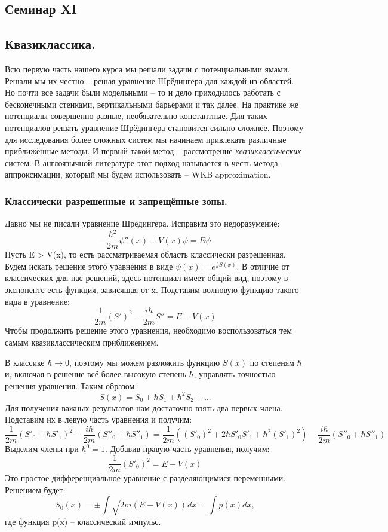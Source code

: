 \begin{center}
    \section{Семинар XI}
\end{center}
\subsection{Квазиклассика.}
\hspace{1em} Всю первую часть нашего курса мы решали задачи с потенциальными ямами. Решали мы их честно -- решая уравнение Шрёдингера для каждой из областей. Но почти все задачи были модельными -- то и дело приходилось работать с бесконечными стенками, вертикальными барьерами и так далее. На практике же потенциалы совершенно разные, необязательно константные. Для таких потенциалов решать уравнение Шрёдингера становится сильно сложнее. Поэтому для исследования более сложных систем мы начинаем привлекать различные приближённые методы. И первый такой метод -- рассмотрение \textit{квазиклассических} систем. В англоязычной литературе этот подход называется в честь метода аппроксимации, который мы будем использовать -- WKB approximation.

\subsubsection{Классически разрешенные и запрещённые зоны.}
\hspace{1em} Давно мы не писали уравнение Шрёдингера. Исправим это недоразумение:
\[
-\frac{\hbar^2}{2m}\psi''(x) + V(x)\psi = E\psi
\]
Пусть E > V(x), то есть рассматриваемая область классически разрешенная. Будем искать решение этого уравнения в виде $\psi(x) = e^{\frac{i}{\hbar}S(x)}$. В отличие от классических для нас решений, здесь потенциал имеет общий вид, поэтому в экспоненте есть функция, зависящая от x. Подставим волновую функцию такого вида в уравнение:
\[
\frac{1}{2m}(S')^2 - \frac{i\hbar}{2m}S'' = E - V(x)
\]
Чтобы продолжить решение этого уравнения, необходимо воспользоваться тем самым квазиклассическим приближением. 

В классике $\hbar \rightarrow 0$, поэтому мы можем разложить функцию $S(x)$ по степеням $\hbar$ и, включая в решение всё более высокую степень $\hbar$, управлять точностью решения уравнения. Таким образом:
\[
S(x) = S_0 + \hbar S_1 + \hbar^2 S_2 + ...
\]
Для получения важных результатов нам достаточно взять два первых члена. Подставим их в левую часть уравнения и получим:
\[
\frac{1}{2m}\left( S'_0 + \hbar S'_1 \right)^2 - \frac{i\hbar}{2m}(S''_0 + \hbar S''_1) = \frac{1}{2m}\left( (S'_0)^2 + 2\hbar S'_0 S'_1 + \hbar^2 (S'_1)^2 \right) - \frac{i\hbar}{2m}(S''_0 + \hbar S''_1)
\]
Выделим члены при $\hbar^0 = 1$. Добавив правую часть уравнения, получим:
\[
\frac{1}{2m}(S'_0)^2 = E - V(x)
\]
Это простое дифференциальное уравнение с разделяющимися переменными. Решением будет:
\[
S_0(x) = \pm \int\sqrt{2m\left( E - V(x) \right)}dx = \int p(x)dx,
\]
где функция p(x) -- классический импульс. 

